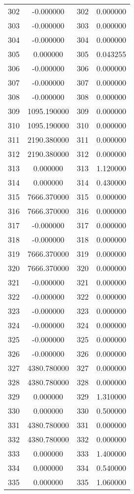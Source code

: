 \documentclass[12pt]{article}
\begin{document}
\begin{longtable}{@{}cccc@{}}
302 & -0.000000 & 302 & 0.000000 \\
303 & -0.000000 & 303 & 0.000000 \\
304 & -0.000000 & 304 & 0.000000 \\
305 & 0.000000 & 305 & 0.043255 \\
306 & -0.000000 & 306 & 0.000000 \\
307 & -0.000000 & 307 & 0.000000 \\
308 & -0.000000 & 308 & 0.000000 \\
309 & 1095.190000 & 309 & 0.000000 \\
310 & 1095.190000 & 310 & 0.000000 \\
311 & 2190.380000 & 311 & 0.000000 \\
312 & 2190.380000 & 312 & 0.000000 \\
313 & 0.000000 & 313 & 1.120000 \\
314 & 0.000000 & 314 & 0.430000 \\
315 & 7666.370000 & 315 & 0.000000 \\
316 & 7666.370000 & 316 & 0.000000 \\
317 & -0.000000 & 317 & 0.000000 \\
318 & -0.000000 & 318 & 0.000000 \\
319 & 7666.370000 & 319 & 0.000000 \\
320 & 7666.370000 & 320 & 0.000000 \\
321 & -0.000000 & 321 & 0.000000 \\
322 & -0.000000 & 322 & 0.000000 \\
323 & -0.000000 & 323 & 0.000000 \\
324 & -0.000000 & 324 & 0.000000 \\
325 & -0.000000 & 325 & 0.000000 \\
326 & -0.000000 & 326 & 0.000000 \\
327 & 4380.780000 & 327 & 0.000000 \\
328 & 4380.780000 & 328 & 0.000000 \\
329 & 0.000000 & 329 & 1.310000 \\
330 & 0.000000 & 330 & 0.500000 \\
331 & 4380.780000 & 331 & 0.000000 \\
332 & 4380.780000 & 332 & 0.000000 \\
333 & 0.000000 & 333 & 1.400000 \\
334 & 0.000000 & 334 & 0.540000 \\
335 & 0.000000 & 335 & 1.060000 \\

\end{longtable}
\end{document}
